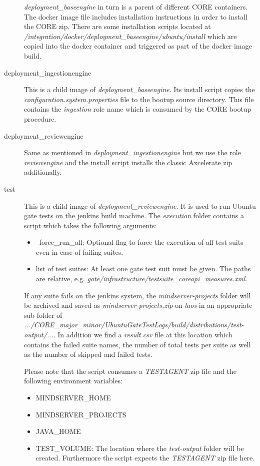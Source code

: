 \begin{description}
			\emph{deployment\_baseengine} in turn is a parent of different CORE containers. The docker image file includes installation instructions in order to install the CORE zip. There are some installation scripts located at \emph{/integration/docker/deployment\_baseengine/ubuntu/install} which are copied into the docker container and triggered as part of the docker image build.
			\item[deployment\_ingestionengine] This is a child image of \emph{deployment\_baseengine}. Its install script copies the \emph{configuration.system.properties} file to the bootup source directory. This file contains the \emph{ingestion} role name which is consumed by the CORE bootup procedure.
			\item[deployment\_reviewengine] Same as mentioned in \emph{deployment\_ingestionengine} but we use the role \emph{reviewengine} and the install script installs the classic Axcelerate zip additionally.
			\item[test] This is a child image of \emph{deployment\_reviewengine}. It is used to run Ubuntu gate tests on the jenkins build machine. The \emph{execution} folder contains a script which takes the following arguments:
			\begin{itemize}
				\item --force\_run\_all: Optional flag to force the execution of all test suits even in case of failing suites.
				\item list of test suites: At least one gate test suit must be given. The paths are relative, e.g. \emph{gate/infrastructure/testsuite\_coreapi\_measures.xml}.
			\end{itemize}
			If any suite fails on the jenkins system, the \emph{mindserver-projects} folder will be archived and saved as \emph{mindserver-projects.zip} on \emph{laos} in an appropriate sub folder of \emph{.../CORE\_major\_minor/UbuntuGateTestLogs/build/distributions/test-output/...}. In addition we find a \emph{result.csv} file at this location which contains the failed suite names, the number of total tests per suite as well as the number of skipped and failed tests.
			
			Please note that the script consumes a \emph{TESTAGENT} zip file and the following environment variables:
			\begin{itemize}
				\item MINDSERVER\_HOME
				\item MINDSERVER\_PROJECTS
				\item JAVA\_HOME
				\item TEST\_VOLUME: The location where the \emph{test-output} folder will be created. Furthermore the script expects the \emph{TESTAGENT} zip file here.
			\end{itemize}
		\end{description}
		
